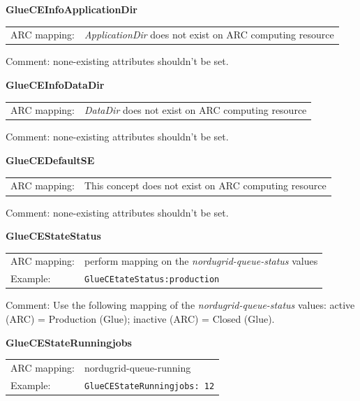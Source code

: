 \documentclass{article}
\begin{document}
\hspace*{0.5cm}
\begin{shaded}
 \textbf{GlueCEInfoApplicationDir} 
\end{shaded}
\begin{tabular}{lp{10cm}}  
  ARC mapping:& {\it ApplicationDir} does not exist on ARC computing resource\\   
\end{tabular}

Comment: none-existing attributes shouldn't be set.


\hspace*{0.5cm}
\begin{shaded}
 \textbf{GlueCEInfoDataDir} 
\end{shaded}
\begin{tabular}{lp{10cm}}  
  ARC mapping:& {\it DataDir} does not exist on ARC computing resource\\    
\end{tabular}

Comment: none-existing attributes shouldn't be set.


\hspace*{0.5cm}
\begin{shaded}
 \textbf{GlueCEDefaultSE} 
\end{shaded}
\begin{tabular}{lp{10cm}}  
  ARC mapping:& This concept does not exist on ARC computing resource\\    
\end{tabular}

Comment:  none-existing attributes shouldn't be set.


\hspace*{0.5cm}
\begin{shaded}
 \textbf{GlueCEStateStatus} 
\end{shaded}
\begin{tabular}{lp{10cm}}  
  ARC mapping:& perform mapping on the {\it nordugrid-queue-status} values\\
  Example:& \verb#GlueCEtateStatus:production #\\
\end{tabular}

Comment: Use the following mapping of the {\it nordugrid-queue-status} values:
active (ARC) = Production (Glue); inactive (ARC) = Closed (Glue).


\hspace*{0.5cm}
\begin{shaded}
 \textbf{GlueCEStateRunningjobs} 
\end{shaded}
\begin{tabular}{lp{10cm}}  
  ARC mapping:& nordugrid-queue-running\\
  Example:& \verb#GlueCEStateRunningjobs: 12#\\
\end{tabular}
\end{document}
